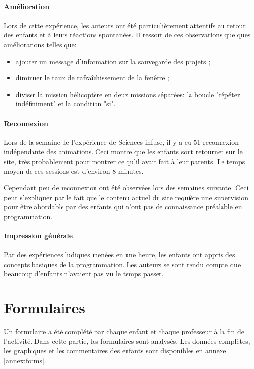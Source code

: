 \paragraph{Amélioration}
Lors de cette expérience, les auteurs ont été particulièrement attentifs au retour des enfants et à leurs réactions spontanées. Il ressort de ces observations quelques améliorations telles que:
\begin{itemize}
  \item ajouter un message d'information sur la sauvegarde des projets ;
  \item diminuer le taux de rafraîchissement de la fenêtre ;
  \item diviser la \gls{mission} hélicoptère en deux \glspl{mission} séparées: la boucle "répéter indéfiniment" et la condition "si".
\end{itemize}

\paragraph{Reconnexion}
Lors de la semaine de l'expérience de Sciences infuse, il y a eu 51 reconnexion indépendante des animations. Ceci montre que les enfants sont retourner sur le site, très probablement pour montrer ce qu'il avait fait à leur parents. Le temps moyen de ces sessions est d'environ 8 minutes.

Cependant peu de reconnexion ont été observées lors des semaines suivante. Ceci peut s'expliquer par le fait que le contenu actuel du site requière une supervision pour être abordable par des enfants qui n'ont pas de connaissance préalable en programmation.

\paragraph{Impression générale}
Par des expériences ludiques menées en une heure, les enfants ont appris des concepts basiques de la programmation. Les auteurs se sont rendu compte que beaucoup d'enfants n'avaient pas vu le temps passer.


\section{Formulaires}
\label{analyse-exp}
Un formulaire a été complété par chaque enfant et chaque professeur à la fin de l'activité. Dans cette partie, les formulaires sont analysés. Les données complètes, les graphiques et les commentaires des enfants sont disponibles en annexe \ref{annex:forms}. %


